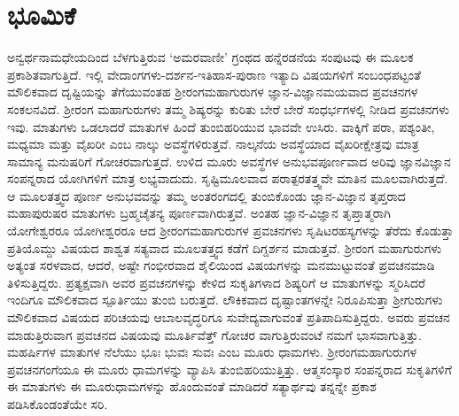 \chapter{ಭೂಮಿಕೆ}
 
 ಅನ್ವರ್ಥನಾಮಧೇಯದಿಂದ ಬೆಳಗುತ್ತಿರುವ `ಅಮರವಾಣೀ' ಗ್ರಂಥದ ಹನ್ನೆರಡನೆಯ ಸಂಪುಟವು ಈ ಮೂಲಕ ಪ್ರಕಾಶಿತವಾಗುತ್ತಿದೆ. ಇಲ್ಲಿ ವೇದಾಂಗಗಳು-ದರ್ಶನ-ಇತಿಹಾಸ-ಪುರಾಣ ಇತ್ಯಾದಿ ವಿಷಯಗಳಿಗೆ ಸಂಬಂಧಪಟ್ಟಂತೆ ಮೌಲಿಕವಾದ ದೃಷ್ಟಿಯನ್ನು ತೆಗೆಯುವಂತಹ ಶ್ರೀರಂಗಮಹಾಗುರುಗಳ ಜ್ಞಾನ-ವಿಜ್ಞಾನಮಯವಾದ ಪ್ರವಚನಗಳ ಸಂಕಲನವಿದೆ. ಶ್ರೀರಂಗ ಮಹಾಗುರುಗಳು ತಮ್ಮ ಶಿಷ್ಯರನ್ನು ಕುರಿತು ಬೇರೆ ಬೇರೆ ಸಂಧರ್ಭಗಳಲ್ಲಿ ನೀಡಿದ ಪ್ರವಚನಗಳು ಇವು. ಮಾತುಗಳು ಒಡಲಾದರೆ ಮಾತುಗಳ ಹಿಂದೆ ತುಂಬಿಹರಿಯುವ ಭಾವವೇ ಉಸಿರು. ವಾಕ್ಕಿಗೆ ಪರಾ, ಪಶ್ಯಂತೀ, ಮಧ್ಯಮಾ ಮತ್ತು ವೈಖರೀ ಎಂಬ ನಾಲ್ಕು ಅವಸ್ಥೆಗಳಿರುತ್ತವೆ. ನಾಲ್ಕನೆಯ ಅವಸ್ಥೆಯಾದ ವೈಖರೀಕ್ಷೇತ್ರವು ಮಾತ್ರ ಸಾಮಾನ್ಯ ಮನುಷರಿಗೆ ಗೋಚರವಾಗುತ್ತದೆ. ಉಳಿದ ಮೂರು ಅವಸ್ಥೆಗಳ ಅನುಭವಪೂರ್ಣವಾದ ಅರಿವು ಜ್ಞಾನವಿಜ್ಞಾನ ಸಂಪನ್ನರಾದ ಯೋಗಿಗಳಿಗೆ ಮಾತ್ರ ಲಭ್ಯವಾದುದು. ಸೃಷ್ಟಿಮೂಲವಾದ ಪರಾತ್ಪರತತ್ತ್ವವೇ ಮಾತಿನ ಮೂಲವಾಗಿರುತ್ತದೆ. ಆ ಮೂಲತತ್ತ್ವದ ಪೂರ್ಣ ಅನುಭವವನ್ನು ತಮ್ಮ ಅಂತರಂಗದಲ್ಲಿ ತುಂಬಿಕೊಂಡು ಜ್ಞಾನ-ವಿಜ್ಞಾನ ತೃಪ್ತರಾದ ಮಹಾಪುರುಷರ ಮಾತುಗಳು ಬ್ರಹ್ಮಚೈತನ್ಯ ಪೂರ್ಣವಾಗಿರುತ್ತವೆ. ಅಂತಹ ಜ್ಞಾನ-ವಿಜ್ಞಾನ ತೃಪ್ತಾತ್ಮರಾಗಿ ಯೋಗೇಶ್ವರರೂ ಯೋಗೀಶ್ವರರೂ ಆದ ಶ್ರೀರಂಗಮಹಾಗುರುಗಳ ಪ್ರವಚನಗಳು ಸೃಷಿಟರಹಸ್ಯಗಳನ್ನು ತೆರೆದು ಕೊಡುತ್ತಾ ಪ್ರತಿಯೊಮ್ದು ವಿಷಯದ ಶಾಶ್ವತ ಸತ್ಯವಾದ ಮೂಲತತ್ತ್ವದ ಕಡೆಗೆ ದಿಗ್ದರ್ಶನ ಮಾಡುತ್ತವೆ. ಶ್ರೀರಂಗ ಮಹಾಗುರುಗಳು ಅತ್ಯಂತ ಸರಳವಾದ, ಆದರೆ, ಅಷ್ಟೇ ಗಂಭೀರವಾದ ಶೈಲಿಯಿಂದ ವಿಷಯಗಳನ್ನು ಮನಮುಟ್ಟುವಂತೆ ಪ್ರವಚನಮಾಡಿ ತಿಳಿಸುತ್ತಿದ್ದರು. ಪ್ರತ್ಯಕ್ಷವಾಗಿ ಅವರ ಪ್ರವಚನಗಳನ್ನು ಕೇಳಿದ ಸುಕೃತಿಗಳಾದ ಶಿಷ್ಯರಿಗೆ ಆ ಮಾತುಗಳನ್ನು ಸ್ಮರಿಸಿದರೆ ಇಂದಿಗೂ ಮೌಲಿಕವಾದ ಸ್ಪೂರ್ತಿಯು ತುಂಬಿ ಬರುತ್ತದೆ. ಲೌಕಿಕವಾದ ದೃಷ್ಟಾಂತಗಳನ್ನೇ ನಿರೂಪಿಸುತ್ತಾ ಶ್ರೀಗುರುಗಳು ಮೌಲಿಕವಾದ ವಿಷಯದ ಪರಿಚಯವು ಆಬಾಲವೃದ್ಧರಿಗೂ ಸುವೇದ್ಯವಾಗುವಂತೆ ಪ್ರತಿಪಾದಿಸುತ್ತಿದ್ದರು. ಅವರು ಪ್ರವಚನ ಮಾಡುತ್ತಿರುವಾಗ ಪ್ರವಚನದ ವಿಷಯವು ಮೂರ್ತಿವೆತ್ತ್ ಗೋಚರ ವಾಗುತ್ತಿರುವಂಟೆ ನಮಗೆ ಭಾಸವಾಗುತ್ತಿತ್ತು. ಮಹರ್ಷಿಗಳ ಮಾತುಗಳ ನೆಲೆಯು ಭೂಃ  ಭುವಃ ಸುವಃ ಎಂಬ ಮೂರು ಧಾಮಗಳು. ಶ್ರೀರಂಗಮಹಾಗುರುಗಳ ಪ್ರವಚನಗಂಗೆಯೂ ಈ ಮೂರು ಧಾಮಗಳನ್ನು ವ್ಯಾಪಿಸಿ ತುಂಬಿಹರಿಯುತ್ತಿತ್ತು. ಆತ್ಮಸಂಸ್ಕಾರ ಸಂಪನ್ನರಾದ ಸುಕೃತಿಗಳಿಗೆ ಈ ಮಾತುಗಳು ಈ ಮೂರುಧಾಮಗಳನ್ನು ಹೊಂದುವಂತೆ ಮಾಡಿದರೆ ಸತ್ಯಾರ್ಥವು ತನ್ನನ್ನೇ ಪ್ರಕಾಶ ಪಡಿಸಿಕೊಂಡಂತೆಯೇ ಸರಿ.

